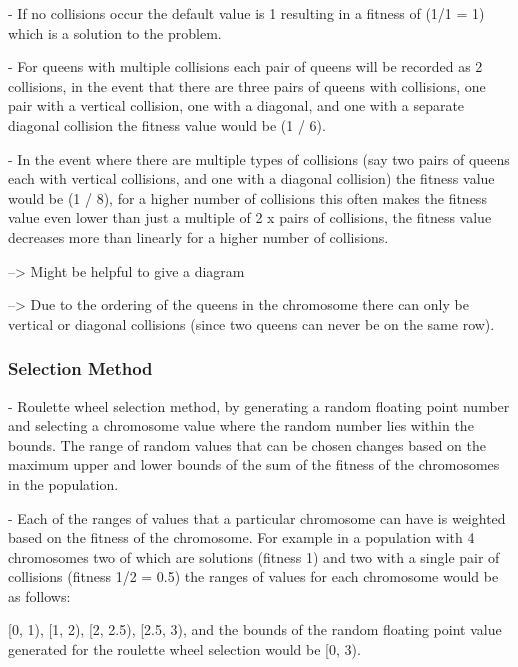 \documentclass{sig-alternate}
\begin{document}
- If no collisions occur the default value is 1 resulting in a fitness of (1/1 = 1) 
  which is a solution to the problem. 
  
- For queens with multiple collisions each pair of queens will be recorded as 2 collisions, 
  in the event that there are three pairs of queens with collisions, one pair with a vertical 
  collision, one with a diagonal, and one with a separate diagonal collision the fitness value 
  would be (1 / 6).
  
- In the event where there are multiple types of collisions (say two pairs of queens each with 
  vertical collisions, and one with a diagonal collision) the fitness value would be (1 / 8), 
  for a higher number of collisions this often makes the fitness value even lower than 
  just a multiple of 2 x pairs of collisions, the fitness value decreases more than linearly
  for a higher number of collisions.

  --> Might be helpful to give a diagram

  --> Due to the ordering of the queens in the chromosome there can only be vertical or diagonal
      collisions (since two queens can never be on the same row).


\subsubsection{Selection Method}
- Roulette wheel selection method, by generating a random floating point number and selecting
  a chromosome value where the random number lies within the bounds. The range
  of random values that can be chosen changes based on the maximum upper and lower
  bounds of the sum of the fitness of the chromosomes in the population.

- Each of the ranges of values that a particular chromosome can have is weighted
  based on the fitness of the chromosome. For example in a population with 4
  chromosomes two of which are solutions (fitness 1) and two with a single pair of collisions
  (fitness 1/2 = 0.5) the ranges of values for each chromosome would be as
  follows:

  [0, 1), [1, 2), [2, 2.5), [2.5, 3), and the bounds of the random floating point value
  generated for the roulette wheel selection would be [0, 3).


\end{document}
